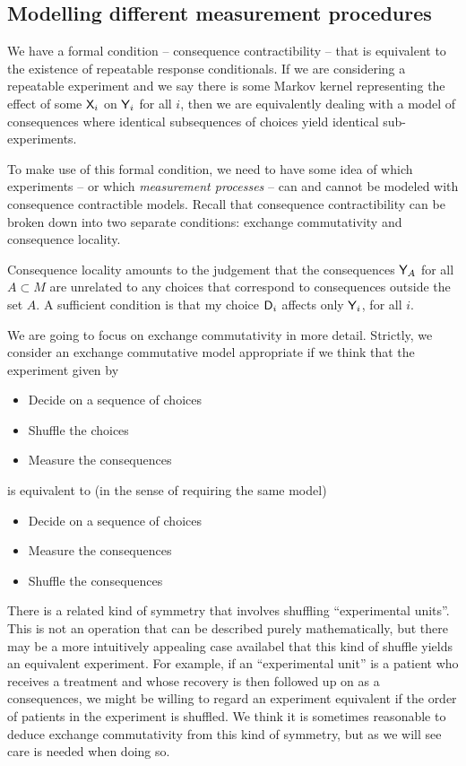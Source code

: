 \subsection{Modelling different measurement procedures}

We have a formal condition -- consequence contractibility -- that is equivalent to the existence of repeatable response conditionals. If we are considering a repeatable experiment and we say there is some Markov kernel representing the effect of some $\mathsf{X}_i$ on $\mathsf{Y}_i$ for all $i$, then we are equivalently dealing with a model of consequences where identical subsequences of choices yield identical sub-experiments. 

To make use of this formal condition, we need to have some idea of which experiments -- or which \emph{measurement processes} -- can and cannot be modeled with consequence contractible models. Recall that consequence contractibility can be broken down into two separate conditions: exchange commutativity and consequence locality.

Consequence locality amounts to the judgement that the consequences $\mathsf{Y}_A$ for all $A\subset M$ are unrelated to any choices that correspond to consequences outside the set $A$. A sufficient condition is that my choice $\mathsf{D}_i$ affects only $\mathsf{Y}_i$, for all $i$.

We are going to focus on exchange commutativity in more detail. Strictly, we consider an exchange commutative model appropriate if we think that the experiment given by
\begin{itemize}
    \item Decide on a sequence of choices
    \item Shuffle the choices
    \item Measure the consequences
\end{itemize}
is equivalent to (in the sense of requiring the same model)
\begin{itemize}
    \item Decide on a sequence of choices
    \item Measure the consequences
    \item Shuffle the consequences
\end{itemize}

There is a related kind of symmetry that involves shuffling ``experimental units''. This is not an operation that can be described purely mathematically, but there may be a more intuitively appealing case availabel that this kind of shuffle yields an equivalent experiment. For example, if an ``experimental unit'' is a patient who receives a treatment and whose recovery is then followed up on as a consequences, we might be willing to regard an experiment equivalent if the order of patients in the experiment is shuffled. We think it is sometimes reasonable to deduce exchange commutativity from this kind of symmetry, but as we will see care is needed when doing so.

